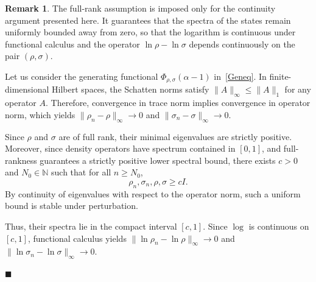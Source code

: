 \documentclass[a4paper, amsfonts, amssymb, amsmath, reprint, showkeys, nofootinbib, twoside, aps, pra]{revtex4-2}
\theoremstyle{definition}
\newtheorem{remark}{Remark}
\renewenvironment{proof}{\noindent{\bfseries Proof.}}{\hfill$\blacksquare$}
\begin{document}
\begin{remark}
The full-rank assumption is imposed only for the continuity argument presented here.
It guarantees that the spectra of the states remain uniformly bounded away from zero, so that the logarithm is continuous under functional calculus and the operator \(\ln\rho-\ln\sigma\)
depends continuously on the pair \((\rho,\sigma).\)
\end{remark}

\begin{proof}
Let us consider the generating functional 
$\Phi_{\rho,\sigma}(\alpha-1)$ in~\eqref{Geneq}. In finite-dimensional Hilbert spaces, the Schatten norms satisfy $\|A\|_\infty \le \|A\|_1$ for any operator $A$. Therefore, convergence in trace norm implies convergence in operator norm, which yields $\|\rho_n-\rho\|_\infty \to 0$ and $\|\sigma_n-\sigma\|_\infty \to 0$. 

Since $\rho$ and $\sigma$ are of full rank, their minimal eigenvalues are strictly positive.
Moreover, since density operators have spectrum contained in $[0,1]$, and full-rankness guarantees a strictly positive lower spectral bound, there exists $c>0$ and $N_0 \in \mathbb{N}$ such that for all $n \ge N_0$,
\begin{equation}
\rho_n,\sigma_n,\rho,\sigma \ge cI.
\end{equation}
By continuity of eigenvalues with respect to the operator norm, such a uniform bound is stable under perturbation. 

Thus, their spectra lie in the compact interval $[c,1]$. 
Since $\log$ is continuous on $[c,1]$, functional calculus yields 
$\|\ln\rho_n-\ln\rho\|_\infty \to 0$ and $\|\ln\sigma_n-\ln\sigma\|_\infty \to 0$.


\end{proof}
\end{document}

